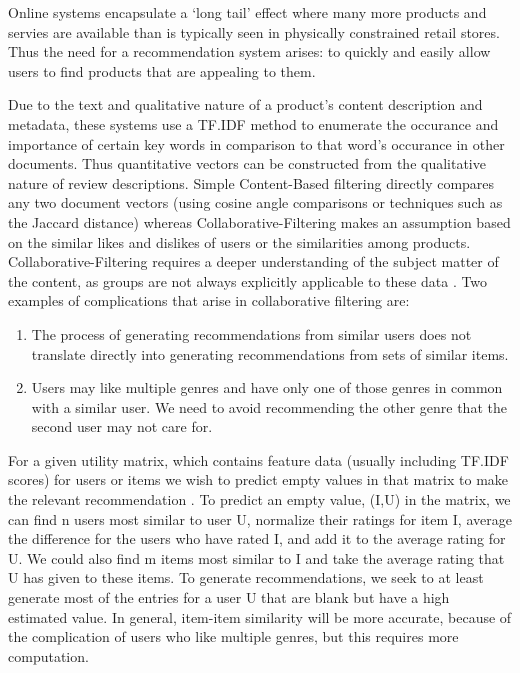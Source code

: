 \documentclass[11pt]{article}
\begin{document}
Online systems encapsulate a `long tail' effect \cite{chapter9} where many more products and servies are available than is typically seen in physically constrained retail stores. Thus the need for a recommendation system arises: to quickly and easily allow users to find products that are appealing to them.
\par Due to the text and qualitative nature of a product's content description and metadata, these systems use a TF.IDF \cite{beginners_guide} method to enumerate the occurance and importance of certain key words in comparison to that word's occurance in other documents. Thus quantitative vectors can be constructed from the qualitative nature of review descriptions. Simple Content-Based filtering directly compares any two document vectors (using cosine angle comparisons or techniques such as the Jaccard distance) \cite{chapter9} whereas Collaborative-Filtering makes an assumption based on the similar likes and dislikes of users or the similarities among products. Collaborative-Filtering requires a deeper understanding of the subject matter of the content, as groups are not always explicitly applicable to these data \cite{chapter9}. Two examples of complications that arise in collaborative filtering are:
\begin{enumerate}
		\item The process of generating recommendations from similar users does not translate directly into generating recommendations from sets of similar items.
		\item Users may like multiple genres and have only one of those genres in common with a similar user. We need to avoid recommending the other genre that the second user may not care for.
\end{enumerate}
\par For a given utility matrix, which contains feature data (usually including TF.IDF scores) for users or items we wish to predict empty values in that matrix to make the relevant recommendation \cite{chapter9}. To predict an empty value, (I,U) in the matrix, we can find n users most similar to user U, normalize their ratings for item I, average the difference for the users who have rated I, and add it to the average rating for U. We could also find m items most similar to I and take the average rating that U has given to these items. To generate recommendations, we seek to at least generate most of the entries for a user U that are blank but have a high estimated value. In general, item-item similarity will be more accurate, because of the complication of users who like multiple genres, but this requires more computation.
\end{document}
